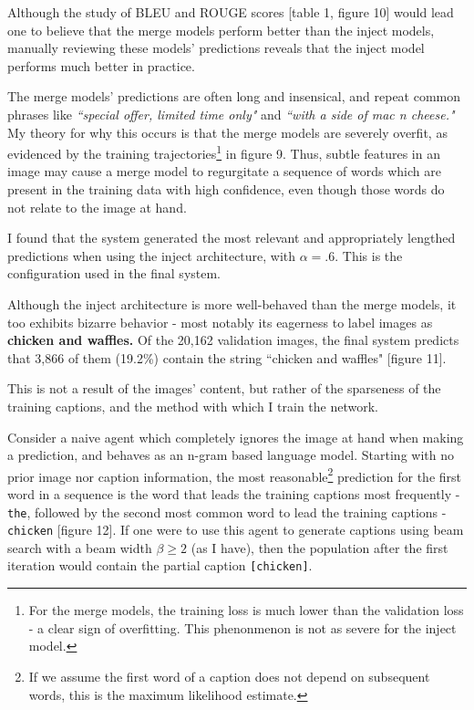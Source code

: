 \documentclass[letterpaper, 10 pt, conference]{ieeeconf}
\begin{document}
Although the study of BLEU and ROUGE scores [table 1, figure 10] would lead one to believe that the merge models perform better than the inject models, manually reviewing these models' predictions reveals   that the inject model performs much better in practice. 

The merge models' predictions are often long and insensical, and repeat common phrases like \textit{``special offer, limited time only"} and \textit{``with a side of mac n cheese."} My theory for why this occurs is that the merge models are severely overfit, as evidenced by the training trajectories\footnote{For the merge models, the training loss is much lower than the validation loss - a clear sign of overfitting. This phenonmenon is not as severe for the inject model.} in figure 9. Thus, subtle features in an image may cause a merge model to regurgitate a sequence of words which are present in the training data with high confidence, even though those words do not relate to the image at hand. 

I found that the system generated the most relevant and appropriately lengthed predictions when using the inject architecture, with $\alpha = .6$. This is the configuration used in the final system.

Although the inject architecture is more well-behaved than the merge models, it too exhibits bizarre behavior - most notably its eagerness to label images as \textbf{chicken and waffles.} Of the 20,162 validation images, the final system predicts that 3,866 of them (19.2\%) contain the string ``chicken and waffles" [figure 11].

This is not a result of the images' content, but rather of the sparseness of the training captions, and the method with which I train the network. 

Consider a naive agent which completely ignores the image at hand when making a prediction, and behaves as an n-gram based language model. Starting with no prior image nor caption information, the most reasonable\footnote{If we assume the first word of a caption does not depend on subsequent words, this is the maximum likelihood estimate.} prediction for the first word in a sequence is the word that leads the training captions most frequently - \texttt{the}, followed by the second most common word to lead the training captions - \texttt{chicken} [figure 12]. If one were to use this agent to generate captions using beam search with a beam width $\beta \geq 2$ (as I have), then the population after the first iteration would contain the partial caption \texttt{[chicken]}.
\end{document}
